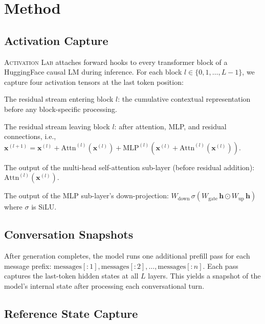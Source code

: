\documentclass[11pt,a4paper]{article}
\begin{document}
\section{Method}

\subsection{Activation Capture}

\textsc{Activation Lab} attaches forward hooks to every transformer block of a HuggingFace causal LM during inference. For each block $l \in \{0, 1, \ldots, L{-}1\}$, we capture four activation tensors at the last token position:

\begin{description}[leftmargin=1.5cm, labelwidth=1.3cm]
  \item[\texttt{hidden\_in}] The residual stream entering block $l$: the cumulative contextual representation before any block-specific processing.
  \item[\texttt{hidden\_out}] The residual stream leaving block $l$: after attention, MLP, and residual connections, i.e., $\mathbf{x}^{(l+1)} = \mathbf{x}^{(l)} + \text{Attn}^{(l)}(\mathbf{x}^{(l)}) + \text{MLP}^{(l)}(\mathbf{x}^{(l)} + \text{Attn}^{(l)}(\mathbf{x}^{(l)}))$.
  \item[\texttt{attn\_out}] The output of the multi-head self-attention sub-layer (before residual addition): $\text{Attn}^{(l)}(\mathbf{x}^{(l)})$.
  \item[\texttt{mlp\_down\_out}] The output of the MLP sub-layer's down-projection: $W_\text{down}\,\sigma(W_\text{gate}\,\mathbf{h} \odot W_\text{up}\,\mathbf{h})$ where $\sigma$ is SiLU.
\end{description}

\subsection{Conversation Snapshots}

After generation completes, the model runs one additional prefill pass for each message prefix: $\text{messages}[:1], \text{messages}[:2], \ldots, \text{messages}[:n]$. Each pass captures the last-token hidden states at all $L$ layers. This yields a snapshot of the model's internal state after processing each conversational turn.

\subsection{Reference State Capture}
\end{document}
